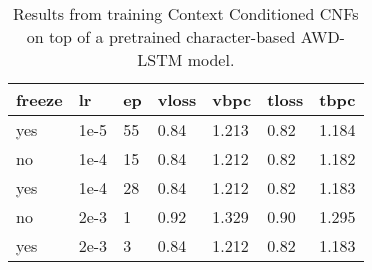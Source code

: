 \begin{table}[]
\centering
\caption{Results from training Context Conditioned CNFs on top of a pretrained character-based AWD-LSTM model.}
\begin{tabular}{|l|l|l|l|l|l|l|}
\hline
\textbf{freeze} & \textbf{lr} & \textbf{ep} & \textbf{vloss} & \textbf{vbpc} & \textbf{tloss} & \textbf{tbpc} \\ \hline
yes             & 1e-5        & 55          & 0.84           & 1.213         & 0.82           & 1.184         \\ \hline
no              & 1e-4        & 15          & 0.84           & 1.212         & 0.82           & 1.182         \\ \hline
yes             & 1e-4        & 28          & 0.84           & 1.212         & 0.82           & 1.183         \\ \hline
no              & 2e-3        & 1           & 0.92           & 1.329         & 0.90           & 1.295         \\ \hline
yes             & 2e-3        & 3           & 0.84           & 1.212         & 0.82           & 1.183         \\ \hline
\end{tabular}
\end{table}